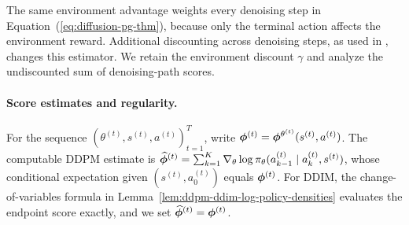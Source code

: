 The same environment advantage weights every denoising step in Equation~(\ref{eq:diffusion-pg-thm}), because only the terminal action affects the environment reward. Additional discounting across denoising steps, as used in \citet{ren2024diffusionpolicypolicyoptimization}, changes this estimator. We retain the environment discount $\gamma$ and analyze the undiscounted sum of denoising-path scores.







\paragraph{Score estimates and regularity.}
For the sequence $(\theta^{(t)},s^{(t)},a^{(t)})_{t=1}^T$, write $\boldsymbol{\phi}^{(t)}=\boldsymbol{\phi}^{\theta^{(t)}}(s^{(t)},a^{(t)})$. The computable DDPM estimate is $\widehat{\boldsymbol{\phi}}^{(t)}=\sum_{k=1}^K\nabla_\theta\log\pi_\theta(a_{k-1}^{(t)}\mid a_k^{(t)},s^{(t)})$, whose conditional expectation given $(s^{(t)},a_0^{(t)})$ equals $\boldsymbol{\phi}^{(t)}$. For DDIM, the change-of-variables formula in Lemma~\ref{lem:ddpm-ddim-log-policy-densities} evaluates the endpoint score exactly, and we set $\widehat{\boldsymbol{\phi}}^{(t)}=\boldsymbol{\phi}^{(t)}$.


